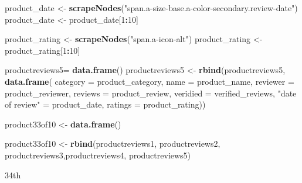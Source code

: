 \documentclass[
]{article}
\newenvironment{Shaded}{\begin{snugshade}}{\end{snugshade}}
\newcommand{\AttributeTok}[1]{\textcolor[rgb]{0.13,0.29,0.53}{#1}}
\newcommand{\DecValTok}[1]{\textcolor[rgb]{0.00,0.00,0.81}{#1}}
\newcommand{\FunctionTok}[1]{\textcolor[rgb]{0.13,0.29,0.53}{\textbf{#1}}}
\newcommand{\NormalTok}[1]{#1}
\newcommand{\OtherTok}[1]{\textcolor[rgb]{0.56,0.35,0.01}{#1}}
\newcommand{\SpecialCharTok}[1]{\textcolor[rgb]{0.81,0.36,0.00}{\textbf{#1}}}
\newcommand{\StringTok}[1]{\textcolor[rgb]{0.31,0.60,0.02}{#1}}
\begin{document}
\begin{Shaded}
\begin{Highlighting}[]
\NormalTok{  product\_date }\OtherTok{\textless{}{-}} \FunctionTok{scrapeNodes}\NormalTok{(}\StringTok{"span.a{-}size{-}base.a{-}color{-}secondary.review{-}date"}\NormalTok{)}
\NormalTok{  product\_date }\OtherTok{\textless{}{-}}\NormalTok{ product\_date[}\DecValTok{1}\SpecialCharTok{:}\DecValTok{10}\NormalTok{]}
  
\NormalTok{  product\_rating }\OtherTok{\textless{}{-}} \FunctionTok{scrapeNodes}\NormalTok{(}\StringTok{"span.a{-}icon{-}alt"}\NormalTok{)}
\NormalTok{  product\_rating }\OtherTok{\textless{}{-}}\NormalTok{ product\_rating[}\DecValTok{1}\SpecialCharTok{:}\DecValTok{10}\NormalTok{]}
  
\NormalTok{  productreviews5}\OtherTok{=} \FunctionTok{data.frame}\NormalTok{()}
\NormalTok{  productreviews5 }\OtherTok{\textless{}{-}} \FunctionTok{rbind}\NormalTok{(productreviews5, }\FunctionTok{data.frame}\NormalTok{(}
                      \AttributeTok{category =}\NormalTok{ product\_category,}
                      \AttributeTok{name =}\NormalTok{ product\_name,}
                      \AttributeTok{reviewer =}\NormalTok{ product\_reviewer,}
                      \AttributeTok{reviews =}\NormalTok{ product\_review,}
                      \AttributeTok{veridied =}\NormalTok{ verified\_reviews,}
                      \StringTok{"date of review"} \OtherTok{=}\NormalTok{ product\_date,}
                      \AttributeTok{ratings =}\NormalTok{ product\_rating))}
  
\NormalTok{  product33of10 }\OtherTok{\textless{}{-}} \FunctionTok{data.frame}\NormalTok{()}
  
\NormalTok{  product33of10 }\OtherTok{\textless{}{-}} \FunctionTok{rbind}\NormalTok{(productreviews1, productreviews2, productreviews3,productreviews4, productreviews5)}
\end{Highlighting}
\end{Shaded}

34th
\end{document}

